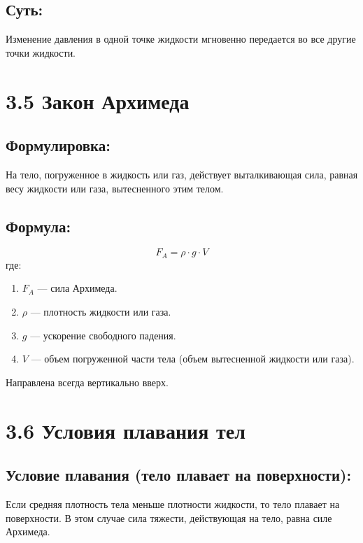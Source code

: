 \documentclass[a4paper,12pt]{article}
\begin{document}
\vspace{-9pt}
\subsection*{Суть:}
\vspace{-3pt}
Изменение давления в одной точке жидкости мгновенно передается во все другие точки жидкости.



\section*{3.5 Закон Архимеда}
\vspace{-9pt}
\subsection*{Формулировка:}
\vspace{-3pt}
На тело, погруженное в жидкость или газ, действует выталкивающая сила, равная весу жидкости или газа, вытесненного этим телом.

\vspace{-9pt}
\subsection*{Формула:}
\vspace{-3pt}
\vspace{-0.05em}
$$ F_A = \rho \cdot g \cdot V $$
где:
\begin{enumerate} [itemsep=0pt, topsep=0pt, parsep=0pt]
  \item $F_A$ — сила Архимеда.
  \item $\rho$ — плотность жидкости или газа.
  \item $g$ — ускорение свободного падения.
  \item $V$ — объем погруженной части тела (объем вытесненной жидкости или газа).
\end{enumerate}
\vspace{10pt}
Направлена всегда вертикально вверх.


\newpage


\section*{3.6 Условия плавания тел}
\vspace{-9pt}
\subsection*{Условие плавания (тело плавает на поверхности):}
\vspace{-3pt}
Если средняя плотность тела меньше плотности жидкости, то тело плавает на поверхности. В этом случае сила тяжести, действующая на тело, равна силе Архимеда.
\end{document}
